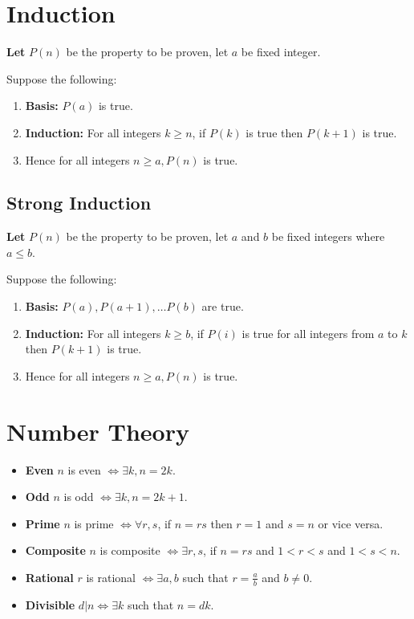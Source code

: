 \documentclass[landscape, letterpaper]{article}
\begin{document}
\begin{multicols}{2}
    \section*{Induction}
    \textbf{Let} $P(n)$ be the property to be proven, let $a$ be fixed integer.

    Suppose the following:
    \begin{enumerate}
        \item \textbf{Basis:} $P(a)$ is true.
        \item \textbf{Induction:} For all integers $k\geq n$, if $P(k)$ is true then $P(k+1)$ is true.
        \item Hence for all integers $n\geq a, P(n)$ is true.
    \end{enumerate}
    \subsection*{Strong Induction}
    \textbf{Let} $P(n)$ be the property to be proven, let $a$ and $b$ be fixed integers where $a\leq b$.

    Suppose the following:
    \begin{enumerate}
        \item \textbf{Basis:} $P(a), P(a+1), \ldots P(b)$ are true.
        \item \textbf{Induction:} For all integers $k\geq b$, if $P(i)$ is true for all integers from $a$ to $k$ then $P(k+1)$ is true.
        \item Hence for all integers $n\geq a, P(n)$ is true.
    \end{enumerate}
    \section*{Number Theory}
    \begin{itemize}
        \item \textbf{Even} $n$ is even $\iff \exists k, n = 2k$.
        \item \textbf{Odd} $n$ is odd $\iff \exists k, n = 2k+1$.
        \item \textbf{Prime} $n$ is prime $\iff \forall r, s$, if $n = rs$ then $r=1$ and $s = n$ or vice versa.
        \item \textbf{Composite} $n$ is composite $\iff \exists r, s$, if $n = rs$ and $1 < r < s$ and $1 < s < n$.
        \item \textbf{Rational} $r$ is rational $\iff \exists a, b$ such that $r = \frac{a}{b}$ and $b \neq 0$.
        \item \textbf{Divisible} $d|n \iff \exists k$ such that $n=dk$.
    \end{itemize}

\end{multicols}
\end{document}
